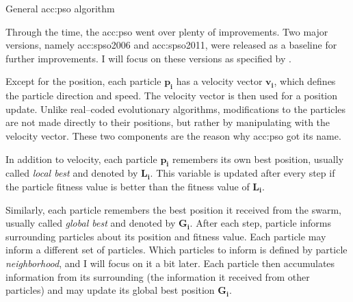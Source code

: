 \begin{algorithm}[b!]
    \caption{General \acrfull*{acc:pso} algorithm}
    \label{alg:PSOgeneral}
\end{algorithm}

Through the time, the \acrshort{acc:pso} went over plenty of improvements. Two major versions, namely \acrfull{acc:spso2006} and \acrfull{acc:spso2011}, were released as a baseline for further improvements. I will focus on these versions as specified by \citet{SPSO}.

Except for the position, each particle $\mathbf{p_i}$ has a velocity vector $\mathbf{v_i}$, which defines the particle direction and speed. The velocity vector is then used for a position update. Unlike real--coded evolutionary algorithms, modifications to the particles are not made directly to their positions, but rather by manipulating with the velocity vector. These two components are the reason why \acrshort{acc:pso} got its name.

In addition to velocity, each particle $\mathbf{p_i}$ remembers its own best position, usually called \emph{local best} and denoted by $\mathbf{L_i}$. This variable is updated after every step if the particle fitness value is better than the fitness value of $\mathbf{L_i}$.

Similarly, each particle remembers the best position it received from the swarm, usually called \emph{global best} and denoted by $\mathbf{G_i}$. After each step, particle informs surrounding particles about its position and fitness value. Each particle may inform a different set of particles. Which particles to inform is defined by particle \emph{neighborhood}, and I will focus on it a bit later. Each particle then accumulates information from its surrounding (the information it received from other particles) and may update its global best position $\mathbf{G_i}$.

